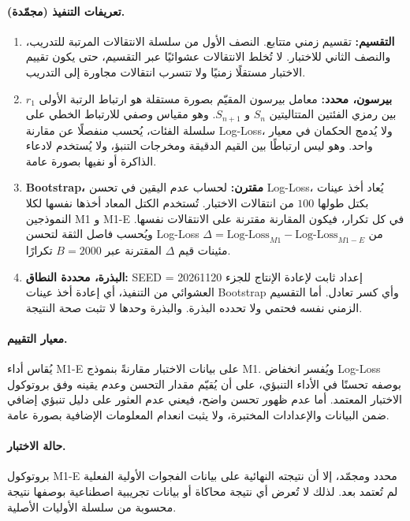 \documentclass[12pt,a4paper]{article}
\begin{document}
\paragraph{تعريفات التنفيذ (مجمّدة).}
\begin{enumerate}
    \item \textbf{التقسيم:} تقسيم زمني متتابع. النصف الأول من سلسلة الانتقالات المرتبة للتدريب، والنصف الثاني للاختبار. لا تُخلط الانتقالات عشوائيًا عبر التقسيم، حتى يكون تقييم الاختبار مستقلًا زمنيًا ولا تتسرب انتقالات مجاورة إلى التدريب.
    \item \textbf{بيرسون، محدد:} معامل بيرسون المقيّم بصورة مستقلة هو ارتباط الرتبة الأولى $r_1$ بين رمزي الفئتين المتتاليتين $S_n$ و $S_{n+1}$. وهو مقياس وصفي للارتباط الخطي على سلسلة الفئات، يُحسب منفصلًا عن مقارنة \textenglish{Log-Loss}، ولا يُدمج الحكمان في معيار واحد. وهو ليس ارتباطًا بين القيم الدقيقة ومخرجات التنبؤ، ولا يُستخدم لادعاء الذاكرة أو نفيها بصورة عامة.
    \item \textbf{Bootstrap، مقترن:} لحساب عدم اليقين في تحسن \textenglish{Log-Loss}، يُعاد أخذ عينات بكتل طولها $100$ من انتقالات الاختبار. تُستخدم الكتل المعاد أخذها نفسها لكلا النموذجين \textenglish{M1} و \textenglish{M1-E} في كل تكرار، فيكون المقارنة مقترنة على الانتقالات نفسها. ويُحسب فاصل الثقة لتحسن \textenglish{Log-Loss} $\Delta = \text{Log-Loss}_{M1} - \text{Log-Loss}_{M1-E}$ من مئينات قيم $\Delta$ المقترنة عبر $B=2000$ تكرارًا.
    \item \textbf{البذرة، محددة النطاق:} \textenglish{SEED = 20261120} إعداد ثابت لإعادة الإنتاج للجزء العشوائي من التنفيذ، أي إعادة أخذ عينات \textenglish{Bootstrap} وأي كسر تعادل. أما التقسيم الزمني نفسه فحتمي ولا تحدده البذرة. والبذرة وحدها لا تثبت صحة النتيجة.
\end{enumerate}
\paragraph{معيار التقييم.}
يُقاس أداء \textenglish{M1-E} على بيانات الاختبار مقارنةً بنموذج \textenglish{M1}. ويُفسر انخفاض \textenglish{Log-Loss} بوصفه تحسنًا في الأداء التنبؤي، على أن يُقيّم مقدار التحسن وعدم يقينه وفق بروتوكول الاختبار المعتمد. أما عدم ظهور تحسن واضح، فيعني عدم العثور على دليل تنبؤي إضافي ضمن البيانات والإعدادات المختبرة، ولا يثبت انعدام المعلومات الإضافية بصورة عامة.
\paragraph{حالة الاختبار.}
بروتوكول \textenglish{M1-E} محدد ومجمّد، إلا أن نتيجته النهائية على بيانات الفجوات الأولية الفعلية لم تُعتمد بعد. لذلك لا تُعرض أي نتيجة محاكاة أو بيانات تجريبية اصطناعية بوصفها نتيجة محسوبة من سلسلة الأوليات الأصلية.
\end{document}
